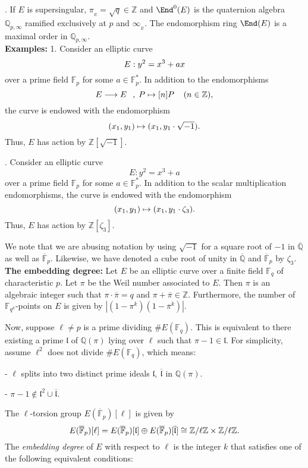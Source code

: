 \documentclass[a4paper, 11pt]{scrreprt}
\numberwithin{equation}{section}
\newcommand{\bz}{\mathbb Z}
\newcommand{\bq}{\mathbb Q}
\newcommand{\bFp}{\mathbb{F}_p}
\newcommand{\bFP}{\ov{\mathbb{F}}_p}
\newcommand{\bFq}{\mathbb{F}_q}
\newcommand{\bFqk}{\mathbb{F}_{q^k}}
\newcommand{\lra}{\longrightarrow}
\newcommand{\mfl}{\mathfrak{l}}
\newcommand{\ov}{\overline}
\newcommand{\vs}{\vspace{-2mm}}
\newcommand{\noin}{\noindent}
\theoremstyle{plain}
\begin{document}
\noin 2. If $E$ is supersingular, $\pi_{_E} = \sqrt{q} \in \bz$ and $\End^0(E)$ is the quaternion algebra $\bq_{p,\infty}$ ramified exclusively at $p$ and $\infty_{_E}$. The endomorphism ring $\End(E)$ is a maximal order in $\bq_{p,\infty}$.\\

\noin \textbf{Examples:} 1. Consider an elliptic curve \vs $$E:y^2 = x^3 + ax \vs $$ over a prime field $\bFp$ for some $a\in \bFp^*$. In addition to the endomorphisms \vs $$E\lra E\;\,\;,\; P\mapsto [n]P\;\;\;\;(n\in\bz),    \vs $$ the curve is endowed with the endomorphism \vs $$(x_1,y_1)\mapsto (x_1,y_1\cdot\sqrt{-1}). \vs $$ Thus, $E$ has action by $\bz[\sqrt{-1}]$.\vspace{1.5mm}

\noin 2. Consider an elliptic curve \vs $$E:y^2 = x^3 + a  $$ over a prime field $\bFp$ for some $a\in \bFp^*$. In addition to the scalar multiplication endomorphisms, the curve is endowed with the endomorphism \vs $$(x_1,y_1)\mapsto (x_1,y_1\cdot\zeta_3). \vs $$ Thus, $E$ has action by $\bz[\zeta_3]$. \vspace{1.5mm}

We note that we are abusing notation by using $\sqrt{-1}$ for a square root of $-1$ in $\ov{\bq}$ as well as $\bFP$. Likewise, we have denoted a cube root of unity in $\ov{\bq}$ and $\bFP$ by $\zeta_3$.\\

\noin \textbf{The embedding degree:} Let $E$ be an elliptic curve over a finite field $\bFq$  of characteristic $p$. Let $\pi$ be the Weil number associated to $E$. Then $\pi$ is an algebraic integer such that $\pi\cdot \ov{\pi} = q$ and $\pi+\ov{\pi}\in \bz$. Furthermore, the number of $\bFqk$-points on $E$ is given by $|(1-\pi^k)(1-\ov{\pi}^k)|$.


Now, suppose $\ell\neq p$ is a prime dividing $\# E(\bFq)$. This is equivalent to there existing a prime $\mfl$ of $\bq(\pi)$ lying over $\ell$ such that $\pi-1\in \mfl$. For simplicity, assume $\ell^2$ does not divide $\# E(\bFq)$, which means:

\noin - $\ell$ splits into two distinct prime ideals $\mfl$, $\ov{\mfl}$ in $\bq(\pi)$.

\noin - $\pi-1\notin \mfl^2\cup \ov{\mfl}$. 

The $\ell$-torsion group $E(\bFP)[\ell]$ is given by \vs $$ E(\bFP)[\ell] = E(\bFP)[\mfl] \oplus E(\bFP)[\ov{\mfl}] \cong \bz/\ell\bz \times \bz/\ell\bz . \vs $$ The \textit{embedding degree} of $E$ with respect to $\ell$ is the integer $k$ that satisfies one of the following equivalent conditions: \vspace{0.1cm}
\end{document}

